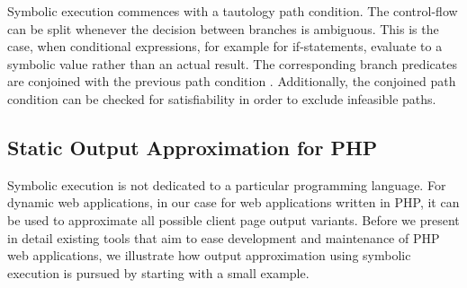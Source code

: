 \documentclass[sigconf]{acmart}
\begin{document}
Symbolic execution commences with a tautology path condition. The control-flow
can be split whenever the decision between branches is ambiguous. This is the
case, when conditional expressions, for example for if-statements, evaluate to
a symbolic value rather than an actual result. The corresponding branch
predicates are conjoined with the previous path condition \cite{King1976}.
Additionally, the conjoined path condition can be checked for satisfiability in
order to exclude infeasible paths.


\subsection{Static Output Approximation for PHP} \label{sec:workflow}
Symbolic execution is not dedicated to a particular
programming language. For dynamic web applications, in our case for web
applications written in PHP, it can be used to approximate all possible client
page output variants. Before we present in detail existing tools that aim to
ease development and maintenance of PHP web applications, we illustrate how output
approximation using symbolic execution is pursued by starting with a small
example.
\end{document}
